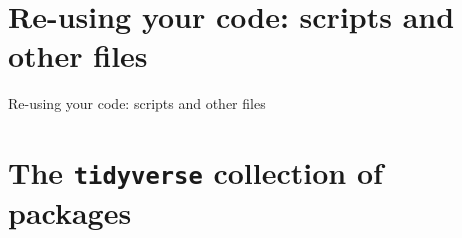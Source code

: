 \documentclass[
  11pt,
  ignorenonframetext,
]{beamer}
\begin{document}
\hypertarget{re-using-your-code-scripts-and-other-files}{%
\section{Re-using your code: scripts and other
files}\label{re-using-your-code-scripts-and-other-files}}

\begin{frame}{Re-using your code: scripts and other files}
\end{frame}

\hypertarget{the-tidyverse-collection-of-packages}{%
\section{\texorpdfstring{The \texttt{tidyverse} collection of
packages}{The tidyverse collection of packages}}\label{the-tidyverse-collection-of-packages}}
\end{document}
